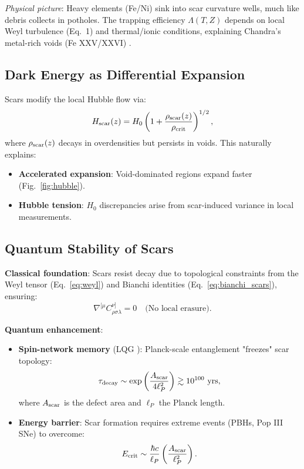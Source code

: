 \documentclass{article}
\begin{document}
\textit{Physical picture}: Heavy elements (Fe/Ni) sink into scar curvature wells, much like debris collects in potholes. The trapping efficiency $\Lambda(T,Z)$ depends on local Weyl turbulence (Eq.~1) and thermal/ionic conditions, explaining Chandra's metal-rich voids (Fe XXV/XXVI) \cite{Simionescu2023}.  


\subsection{Dark Energy as Differential Expansion}  
Scars modify the local Hubble flow via:  
\begin{equation}  
H_{\rm scar}(z) = H_0 \left(1 + \frac{\rho_{\rm scar}(z)}{\rho_{\rm crit}}\right)^{1/2},  
\label{eq:hubble_scars}  
\end{equation}  
where $\rho_{\rm scar}(z)$ decays in overdensities but persists in voids. This naturally explains:  
\begin{itemize}  
  \item \textbf{Accelerated expansion}: Void-dominated regions expand faster (Fig.~\ref{fig:hubble}).  
  \item \textbf{Hubble tension}: $H_0$ discrepancies arise from scar-induced variance in local measurements.  
\end{itemize}  

\subsection{Quantum Stability of Scars}  
\label{sec:quantum}  

\textbf{Classical foundation}:  
Scars resist decay due to topological constraints from the Weyl tensor (Eq.~\ref{eq:weyl}) and Bianchi identities (Eq.~\ref{eq:bianchi_scars}), ensuring:  
\begin{equation}  
\nabla^{[\mu} C^{\nu]}_{\rho\sigma\lambda} = 0 \quad \text{(No local erasure)}.  
\end{equation}  

\textbf{Quantum enhancement}:  
\begin{itemize}  
    \item \textbf{Spin-network memory} (LQG \cite{Ashtekar2016}):  
    Planck-scale entanglement "freezes" scar topology:  
    \begin{equation}  
    \tau_{\rm decay} \sim \exp\left(\frac{A_{\rm scar}}{4\ell_P^2}\right) \gtrsim 10^{100} \text{ yrs},  
    \label{eq:decay}  
    \end{equation}  
    where $A_{\rm scar}$ is the defect area and $\ell_P$ the Planck length.  

    \item \textbf{Energy barrier}:  
    Scar formation requires extreme events (PBHs, Pop III SNe) to overcome:  
    \begin{equation}  
    E_{\rm crit} \sim \frac{\hbar c}{\ell_P} \left(\frac{A_{\rm scar}}{\ell_P^2}\right).  
    \label{eq:energy}  
    \end{equation}  
\end{itemize}  
\end{document}

